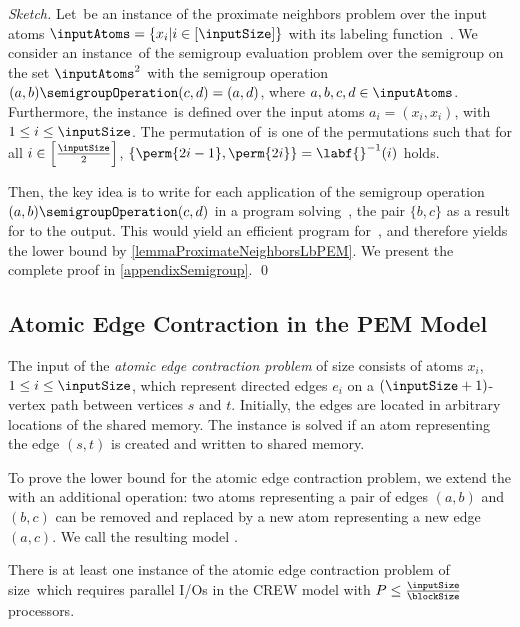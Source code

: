 \documentclass[envcountsame]{llncs}
\def\bOm#1{\printmath{\Omega \left(#1\right)}}
\begin{document}
\begin{proof}[Sketch]
Let~\instPN be an instance of the proximate neighbors problem over the input atoms $\inputAtoms=\{x_i|i\in[\inputSize]\}$ with its labeling function~\labf.
We consider an instance~\instSE of the semigroup evaluation problem over the semigroup on the set $\inputAtoms^2$ with the semigroup operation $(a,b)\semigroupOperation(c,d) = (a,d)$, where $a,b,c,d\in \inputAtoms$.
Furthermore, the instance~\instSE is defined over the input atoms $a_i=(x_i,x_i)$, with $1\leq i\leq \inputSize$.
The permutation \perm{} of~\instSE is one of the permutations such that for all $i\in\left[\frac{\inputSize}{2}\right]$, $\{\perm{2i-1},\perm{2i}\} = \labf{}^{-1}(i)$ holds.

Then, the key idea is to write for each application of the semigroup operation $(a,b)\semigroupOperation(c,d)$ in a program solving~\instSE, the pair $\{b,c\}$ as a result for \instPN to the output.
This would yield an efficient program for~\instPN, and therefore yields the lower bound by \autoref{lemmaProximateNeighborsLbPEM}.
We present the complete proof in \autoref{appendixSemigroup}.
\qed
\end{proof}

\subsection{Atomic Edge Contraction in the PEM Model} 
\label{sectionListRankingLB}



\begin{definition}
The input of the {\em atomic edge contraction problem} of size  consists of atoms $x_i$, $1\leq i \leq \inputSize$, which represent directed edges $e_i$ on a $(\inputSize+1)$-vertex path between vertices $s$ and $t$. Initially, the edges are located in arbitrary locations of the shared memory.
The instance is solved if an atom representing the edge $(s,t)$ is created and written to shared memory.
\end{definition}

To prove the lower bound for the atomic edge contraction problem, we extend the \movePEM with an additional operation: 
two atoms representing a pair of edges $(a,b)$ and $(b,c)$ can be removed and replaced by a new atom representing a new edge $(a,c)$.
We call the resulting model {\em \bridgingPEM}.





\begin{theorem} 
\label{lemmaAtomicEdgeContraction}
There is at least one instance of the atomic edge contraction problem of size~ which requires \bOm{\permp{\inputSize,\memorySize,\blockSize}} parallel I/Os in the CREW \bridgingPEM model with $P\leq\frac{\inputSize}{\blockSize}$ processors.
\end{theorem}
\end{document}
